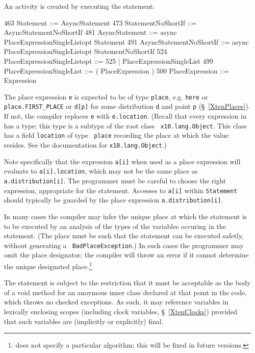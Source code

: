 An activity is created by executing the statement:
\begin{x10}
463 Statement ::= AsyncStatement
473 StatementNoShortIf ::= AsyncStatementNoShortIf
481 AsyncStatement ::= 
      async PlaceExpressionSingleListopt Statement
491 AsyncStatementNoShortIf ::= 
      async PlaceExpressionSingleListopt 
         StatementNoShortIf
524   PlaceExpressionSingleListopt ::=
525       | PlaceExpressionSingleList
499   PlaceExpressionSingleList ::= 
         ( PlaceExpression )
500   PlaceExpression ::= Expression
\end{x10} 

The place expression {\tt e} is expected to be of type {\tt place},
e.g.{} {\tt here} or {\tt place.FIRST\_PLACE} or {\tt d[p]} for some
distribution {\tt d} and point {\tt p} (\S~\ref{XtenPlaces}).  
If not, the compiler replaces
{\tt e} with {\tt e.location}. (Recall that every expression in
\Xten{} has a type; this type is a subtype of the root class {\tt
x10.lang.Object}.  This class has a field {\tt location} of type {\tt
place} recording the place at which the value resides. See
the documentation for {\tt x10.lang.Object}.)

Note specifically that the expression {\tt a[i]} when used as a place
expression will evaluate to {\tt a[i].location}, which may not be
the same place as {\tt a.distribution[i]}. The programmer must be 
careful to choose the right expression, appropriate for the statement.
Accesses to {\tt a[i]} within {\tt Statement} should typically be guarded 
by the place expression {\tt a.distribution[i]}.

In many cases the compiler may infer the unique place at which the
statement is to be executed by an analysis of the types of the
variables occuring in the statement. (The place must be such that the
statement can be executed safetly, without generating a {\tt
BadPlaceException}.) In such cases the programmer may omit the place
designator; the compiler will throw an error if it cannot 
determine the unique designated place.\footnote{\XtenCurrVer{} does 
not specify a particular algorithm; this will be fixed in future versions.}

The statement is subject to the restriction that it must be acceptable
as the body of a {\cf void} method for an anoymous inner class
declared at that point in the code, which throws no checked
exceptions. As such, it may reference variables in lexically enclosing
scopes (including {\cf clock} variables, \S~\ref{XtenClocks}) provided
that such variables are (implicitly or explicitly) {\cf final}.

